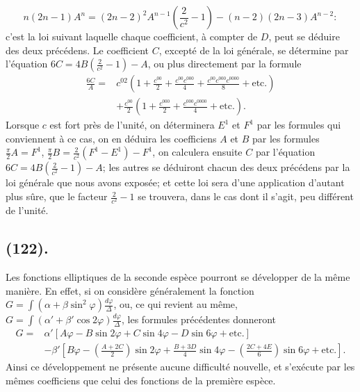\documentclass{article}
\begin{document}
\[ n(2n-1)A^{n}=(2n-2)^{2}A^{n-1}\left(\frac{2}{c^{2}}-1\right)-(n-2)(2n-3)A^{n-2}: \]
c'est la loi suivant laquelle chaque coefficient, à compter de $D$, peut se déduire des deux précédens. Le coefficient $C$, excepté de la loi générale, se détermine par l'équation $6C=4B\left(\frac{2}{c^{2}}-1\right)-A$, ou plus directement par la formule
\[ \begin{aligned} \frac{6C}{A}={}&c^{02}\left(1+\frac{c^{00}}{2}+\frac{c^{00}c^{000}}{4}+\frac{c^{00}c^{000}c^{0000}}{8}+\text{etc.}\right)\\ &+\frac{c^{00}}{2}\left(1+\frac{c^{000}}{2}+\frac{c^{000}c^{0000}}{4}+\text{etc.}\right). \end{aligned} \]
Lorsque $c$ est fort près de l'unité, on déterminera $E^{1}$ et $F^{1}$ par les formules qui conviennent à ce cas, on en déduira les coefficiens $A$ et $B$ par les formules $\frac{\pi}{2}A=F^{1}$, $\frac{\pi}{2}B=\frac{2}{c^{2}}(F^{1}-E^{1})-F^{1}$, on calculera ensuite $C$ par l'équation $6C=4B\left(\frac{2}{c^{2}}-1\right)-A$; les autres se déduiront chacun des deux précédens par la loi générale que nous avons exposée; et cette loi sera d'une application d'autant plus sûre, que le facteur $\frac{2}{c^{2}}-1$ se trouvera, dans le cas dont il s'agit, peu différent de l'unité.

\subsection*{(122).}

Les fonctions elliptiques de la seconde espèce pourront se développer de la même manière. En effet, si on considère généralement la fonction $G=\displaystyle\int(\alpha+\beta\sin^{2}\varphi)\frac{d\varphi}{\Delta}$, ou, ce qui revient au même, $G=\displaystyle\int(\alpha'+\beta'\cos2\varphi)\frac{d\varphi}{\Delta}$, les formules précédentes donneront
\[ \begin{aligned} G={}&\alpha'[A\varphi-B\sin2\varphi+C\sin4\varphi-D\sin6\varphi+\text{etc.}]\\ &-\beta'\left[B\varphi-\left(\frac{A+2C}{2}\right)\sin2\varphi+\frac{B+3D}{4}\sin4\varphi-\left(\frac{2C+4E}{6}\right)\sin6\varphi+\text{etc.}\right]. \end{aligned} \]
Ainsi ce développement ne présente aucune difficulté nouvelle, et s'exécute par les mêmes coefficiens que celui des fonctions de la première espèce.
\end{document}
